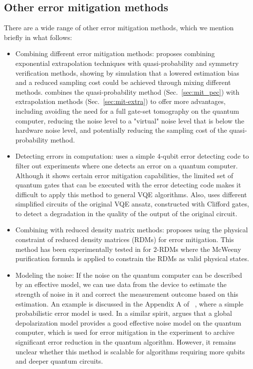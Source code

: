 \subsection{Other error mitigation methods}

There are a wide range of other error mitigation methods, which we mention briefly in what follows: 

\begin{itemize}
\item Combining different error mitigation methods: \citet{caiMultiexponentialErrorExtrapolation2021} proposes combining exponential extrapolation techniques with quasi-probability and symmetry verification methods, showing by simulation that a lowered estimation bias and a reduced sampling cost could be achieved through mixing different methods. \citet{mari2021extending} combines the quasi-probability method (Sec.~\ref{sec:mit_pec}) with extrapolation methods (Sec.~\ref{sec:mit-extra}) to offer more advantages, including avoiding the need for a full gate-set tomography on the quantum computer, reducing the noise level to a "virtual" noise level that is below the hardware noise level, and potentially reducing the sampling cost of the quasi-probability method.

\item Detecting errors in computation: \citet{urbanekQuantumErrorDetection2019} uses a simple $4$-qubit error detecting code to filter out experiments where one detects an error on a quantum computer. Although it shows certain error mitigation capabilities, the limited set of quantum gates that can be executed with the error detecting code makes it difficult to apply this method to general VQE algorithms.
Also, \citet{mezher2021mitigating} uses different simplified circuits of the original VQE ansatz, constructed with Clifford gates, to detect a degradation in the quality of the output of the original circuit.

\item Combining with reduced density matrix methods: \citet{Rubin2018} proposes using the physical constraint of reduced density matrices (RDMs) for error mitigation. This method has been experimentally tested in \citet{mccaskeyQuantumChemistryBenchmark2019} for $2$-RDMs where the McWeeny purification formula \cite{mcweenypurificationformula} is applied to constrain the RDMs as valid physical states.

\item Modeling the noise: If the noise on the quantum computer can be described by an effective model, we can use data from the device to estimate the strength of noise in it and correct the measurement outcome based on this estimation. An example is discussed in the Appendix A of ~\citet{Tilly2021}, where a simple probabilistic error model is used. In a similar spirit, \citet{vovroshSimpleMitigationGlobal2021} argues that a global depolarization model provides a good effective noise model on the quantum computer, which is used for error mitigation in the experiment to archive significant error reduction in the quantum algorithm. However, it remains unclear whether this method is scalable for algorithms requiring more qubits and deeper quantum circuits.


\end{itemize}
